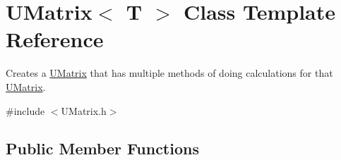 \hypertarget{class_u_matrix}{}\section{U\+Matrix$<$ T $>$ Class Template Reference}
\label{class_u_matrix}


Creates a \mbox{\hyperlink{class_u_matrix}{U\+Matrix}} that has multiple methods of doing calculations for that \mbox{\hyperlink{class_u_matrix}{U\+Matrix}}.  




{\ttfamily \#include $<$U\+Matrix.\+h$>$}

\subsection*{Public Member Functions}
